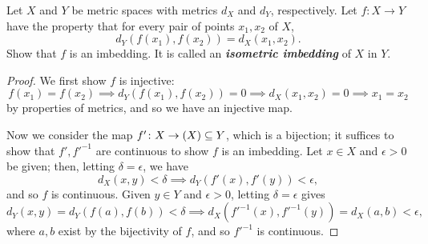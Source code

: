 \documentclass[12pt]{article}
\theoremstyle{remark}
\let\Im\relax
\DeclareMathOperator{\Im}{im}
\begin{document}
\begin{problem}\label{exc:21.2}
  Let $X$ and $Y$ be metric spaces with metrics $d_X$ and $d_Y$, respectively.
  Let $f \colon X \to Y$ have the property that for every pair of points $x_1,x_2$ of $X$,
  \begin{equation*}
    d_Y(f(x_1),f(x_2)) = d_X(x_1,x_2).
  \end{equation*}
  Show that $f$ is an imbedding. It is called an \emph{\textbf{isometric imbedding}} of $X$ in $Y$.
\end{problem}
\begin{proof}
  We first show $f$ is injective:
  \begin{equation*}
    f(x_1) = f(x_2) \implies d_Y(f(x_1),f(x_2)) = 0 \implies d_X(x_1,x_2) = 0 \implies x_1 = x_2
  \end{equation*}
  by properties of metrics, and so we have an injective map.
  \par Now we consider the map $f'\colon X \to \Im(X) \subseteq Y$, which is a bijection; it suffices to show that $f',f'^{-1}$ are continuous to show $f$ is an imbedding. Let $x \in X$ and $\epsilon > 0$ be given; then, letting $\delta = \epsilon$, we have
  \begin{equation*}
    d_X(x,y) < \delta \implies d_Y(f'(x),f'(y)) < \epsilon,
  \end{equation*}
  and so $f$ is continuous. Given $y \in Y$ and $\epsilon > 0$, letting $\delta = \epsilon$ gives
  \begin{equation*}
    d_Y(x,y) = d_Y(f(a),f(b)) < \delta \implies d_X(f'^{-1}(x),f'^{-1}(y)) = d_X(a,b) < \epsilon,
  \end{equation*}
  where $a,b$ exist by the bijectivity of $f$, and so $f'^{-1}$ is continuous.
\end{proof}
\end{document}

